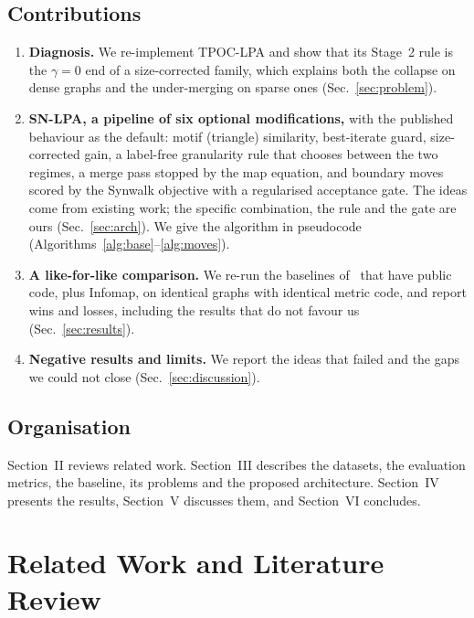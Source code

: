 \documentclass[conference]{IEEEtran}
\begin{document}
\subsection{Contributions}\label{sec:contrib}
\begin{enumerate}
\item \textbf{Diagnosis.} We re-implement TPOC-LPA and show that its Stage~2 rule is the $\gamma{=}0$ end of a size-corrected family, which explains both the collapse on dense graphs and the under-merging on sparse ones (Sec.~\ref{sec:problem}).
\item \textbf{SN-LPA, a pipeline of six optional modifications,} with the published behaviour as the default: motif (triangle) similarity, best-iterate guard, size-corrected gain, a label-free granularity rule that chooses between the two regimes, a merge pass stopped by the map equation, and boundary moves scored by the Synwalk objective with a regularised acceptance gate. The ideas come from existing work; the specific combination, the rule and the gate are ours (Sec.~\ref{sec:arch}). We give the algorithm in pseudocode (Algorithms~\ref{alg:base}--\ref{alg:moves}).
\item \textbf{A like-for-like comparison.} We re-run the baselines of~\cite{kong2026} that have public code, plus Infomap, on identical graphs with identical metric code, and report wins and losses, including the results that do not favour us (Sec.~\ref{sec:results}).
\item \textbf{Negative results and limits.} We report the ideas that failed and the gaps we could not close (Sec.~\ref{sec:discussion}).
\end{enumerate}

\subsection{Organisation}
Section~II reviews related work. Section~III describes the datasets, the evaluation metrics, the baseline, its problems and the proposed architecture. Section~IV presents the results, Section~V discusses them, and Section~VI concludes.

\section{Related Work and Literature Review}\label{sec:related}
\end{document}
